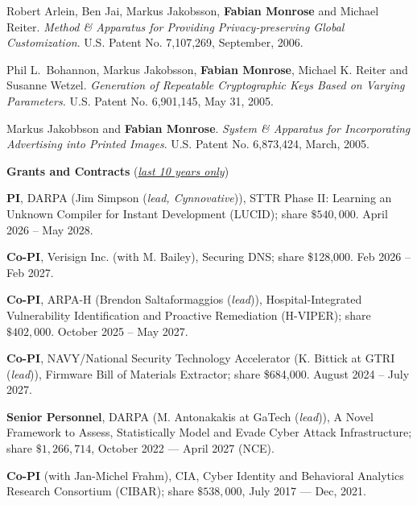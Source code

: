 \documentclass[11pt]{article}
\newcommand{\alignboth}[2]{\noindent \parbox[t]{85pt} {\bf#1} \parbox[t]{400pt}{#2} \vspace{0.5\baselineskip} }
\newcommand{\headingsgap}{\vspace{\baselineskip}}
\newenvironment{cvhanglist}{%
  \begin{list}{}{%
    \setlength{\leftmargin}{1.8em}%
    \setlength{\itemindent}{-1.8em}%
    \setlength{\labelwidth}{0pt}%
    \setlength{\labelsep}{0pt}%
    \setlength{\itemsep}{0.35em}%
    \setlength{\parsep}{0pt}%
    \setlength{\topsep}{0.25em}%
  }%
}{\end{list}}
\begin{document}
\begin{cvhanglist}
\begin{enumerate}[resume]
{\item Robert Arlein, Ben Jai, Markus Jakobsson, \textbf{Fabian Monrose} and Michael Reiter. \emph{
Method \& Apparatus for Providing Privacy-preserving Global Customization}. U.S. Patent No. 7,107,269, September, 2006.

\item Phil L.~Bohannon, Markus Jakobsson, \textbf{Fabian Monrose}, Michael
 K. Reiter and Susanne Wetzel. \emph{Generation of Repeatable
 Cryptographic Keys Based on Varying Parameters.} U.S. Patent
 No. 6,901,145, May 31, 2005.

\item Markus Jakobbson and \textbf{Fabian Monrose}. \emph{System \& Apparatus
 for Incorporating Advertising into Printed Images}. U.S. Patent
 No. 6,873,424, March, 2005.
}

\end{enumerate}


\headingsgap
\item{\textbf{Grants and Contracts} ({\it \underline{last 10 years only}})}
\begin{cvhanglist}
{
\item {\bf PI}, DARPA (Jim Simpson ({\it lead, Cynnovative})), {\sc STTR Phase II: Learning an Unknown Compiler for Instant Development (LUCID)}; share  $\$540,000$. April 2026 -- May 2028. \hfill

\item {\bf Co-PI}, Verisign Inc. (with M. Bailey), {\sc Securing DNS}; share \$128,000. Feb 2026 -- Feb 2027. \hfill

\item {\bf Co-PI}, ARPA-H (Brendon Saltaformaggios ({\it lead})), {\sc Hospital-Integrated Vulnerability Identification and Proactive Remediation (H-VIPER)}; share  $\$402,000$. October 2025 -- May 2027. \hfill


\item {\bf Co-PI}, NAVY/National Security Technology Accelerator (K. Bittick at GTRI ({\it lead})), {\sc Firmware Bill of Materials Extractor}; share \$684,000. August 2024 -- July 2027. \hfill

\item {\bf Senior Personnel}, DARPA (M. Antonakakis at GaTech ({\it lead})), {\sc A Novel Framework to Assess, Statistically Model and Evade Cyber Attack Infrastructure}; share $\$1,266,714$, October 2022 --- April 2027 (NCE). \hfill
}
\item {\bf Co-PI} (with Jan-Michel Frahm), CIA, {\sc Cyber Identity and Behavioral Analytics Research Consortium (CIBAR)}; share  $\$538,000$, July 2017 --- Dec, 2021. \hfill


\end{cvhanglist}
\end{cvhanglist}
\end{document}
